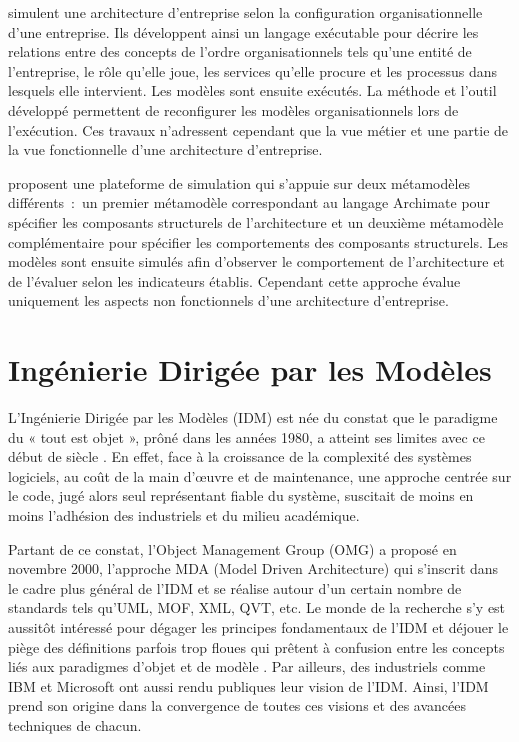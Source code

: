 \cite{ludwig2011organizational} simulent une architecture d'entreprise selon la configuration organisationnelle d'une entreprise. Ils développent ainsi un langage exécutable pour décrire les relations entre des concepts de l'ordre organisationnels tels qu'une entité de l'entreprise, le rôle qu'elle joue, les services qu'elle procure et les processus dans lesquels elle intervient. Les modèles sont ensuite exécutés. La méthode et l'outil développé permettent de reconfigurer les modèles organisationnels lors de l'exécution. Ces travaux n'adressent cependant que la vue métier et une partie de la vue fonctionnelle d'une architecture d'entreprise.

\cite{manzur2015xarchimate} proposent une plateforme de simulation qui s'appuie sur deux métamodèles différents~:~un premier métamodèle correspondant au langage Archimate pour spécifier les composants structurels de l'architecture et un deuxième métamodèle complémentaire pour spécifier les comportements des composants structurels. Les modèles sont ensuite simulés afin d'observer le comportement de l'architecture et de l'évaluer selon les indicateurs établis. Cependant cette approche évalue uniquement les aspects non fonctionnels d'une architecture d'entreprise.






\section{Ingénierie Dirigée par les Modèles}

L'Ingénierie Dirigée par les Modèles (IDM) est née du constat que le paradigme 
du « tout est objet », prôné dans les années 1980, a atteint ses limites avec ce 
début de siècle \cite{greenfield2004software}. En effet, face à la croissance de 
la complexité des systèmes logiciels, au coût de la main d'œuvre et de 
maintenance, une approche centrée sur le code, jugé alors seul représentant 
fiable du système, suscitait de moins en moins l'adhésion des industriels et du 
milieu académique. 

Partant de ce constat, l'Object Management Group (OMG) a proposé en novembre 
2000, l'approche MDA (Model Driven Architecture) qui s'inscrit dans le cadre 
plus général de l'IDM et se réalise autour d'un certain nombre de standards tels 
qu'UML, MOF, XML, QVT, etc. Le monde de la recherche s'y est aussitôt intéressé 
pour dégager les principes fondamentaux de l'IDM 
\cite{bezivin2001towards}\cite{kent2002model} \cite{de2002using} et déjouer le 
piège des définitions parfois trop floues qui prêtent à confusion entre les 
concepts liés aux paradigmes d'objet et de modèle \cite{bezivin2004search}. Par 
ailleurs, des industriels comme IBM \cite{booch2004mda} et Microsoft 
\cite{greenfield2004software} ont aussi rendu publiques leur vision de l'IDM. 
Ainsi, l'IDM prend son origine dans la convergence de toutes ces visions et des 
avancées techniques de chacun.

